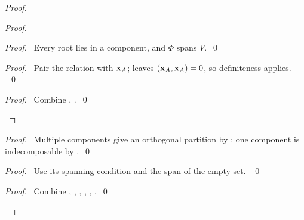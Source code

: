 \begin{proof}
\begin{proof}
\begin{proof}\pf\ Every root lies in a component, and $\Phi$ spans $V$.~\qed\end{proof}
\begin{proof}\pf\ Pair the relation with ${\mathbf x}_A$;
 leaves $({\mathbf x}_A,{\mathbf x}_A)=0$, so definiteness applies. ~\qed\end{proof}
\qedstep
\begin{proof}\pf\ Combine , .~\qed\end{proof}
\end{proof}
\begin{proof}\pf\ Multiple components give an orthogonal partition by
; one component is indecomposable by .~\qed\end{proof}
\begin{proof}\pf\ Use its spanning condition and the span of the empty set. ~\qed\end{proof}
\qedstep
\begin{proof}\pf\ Combine , ,
, , , .~\qed\end{proof}
\end{proof}

